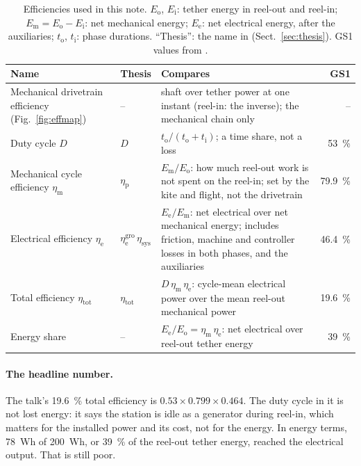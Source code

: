 \documentclass[11pt,a4paper]{article}
\begin{document}
\begin{table}[H]
\centering\small
\caption{Efficiencies used in this note. $E_\mathrm{o}$, $E_\mathrm{i}$: tether
energy in reel-out and reel-in; $E_\mathrm{m} = E_\mathrm{o} - E_\mathrm{i}$:
net mechanical energy; $E_\mathrm{e}$: net electrical energy, after the
auxiliaries; $t_\mathrm{o}$, $t_\mathrm{i}$: phase durations. ``Thesis'': the name in
\cite{fechner2016} (Sect.~\ref{sec:thesis}). GS1 values from \cite{fechner2011}.}
\label{tab:eff}
\begin{tabularx}{\textwidth}{llXr}
\toprule
Name & Thesis & Compares & GS1 \\
\midrule
Mechanical drivetrain efficiency (Fig.~\ref{fig:effmap}) & -- & shaft over tether power at one instant (reel-in: the inverse); the mechanical chain only & -- \\
Duty cycle $D$ & $D$ & $t_\mathrm{o}/(t_\mathrm{o}+t_\mathrm{i})$; a time share, not a loss & \SI{53}{\percent} \\
Mechanical cycle efficiency $\eta_\mathrm{m}$ & $\eta_\mathrm{p}$ & $E_\mathrm{m}/E_\mathrm{o}$: how much reel-out work is not spent on the reel-in; set by the kite and flight, not the drivetrain & \SI{79.9}{\percent} \\
Electrical efficiency $\eta_\mathrm{e}$ & $\eta_\mathrm{e}^\mathrm{gro}\,\eta_\mathrm{sys}$ & $E_\mathrm{e}/E_\mathrm{m}$: net electrical over net mechanical energy; includes friction, machine and controller losses in both phases, and the auxiliaries & \SI{46.4}{\percent} \\
Total efficiency $\eta_\mathrm{tot}$ & $\eta_\mathrm{tot}$ & $D\,\eta_\mathrm{m}\,\eta_\mathrm{e}$: cycle-mean electrical power over the mean reel-out mechanical power & \SI{19.6}{\percent} \\
Energy share & -- & $E_\mathrm{e}/E_\mathrm{o} = \eta_\mathrm{m}\,\eta_\mathrm{e}$: net electrical over reel-out tether energy & \SI{39}{\percent} \\
\bottomrule
\end{tabularx}
\end{table}

\paragraph{The headline number.} The talk's \SI{19.6}{\percent} total
efficiency is $0.53 \times 0.799 \times 0.464$. The duty cycle in it is not lost
energy: it says the station is idle as a generator during reel-in, which
matters for the installed power and its cost, not for the energy. In energy
terms, \SI{78}{Wh} of \SI{200}{Wh}, or \SI{39}{\percent} of the reel-out tether
energy, reached the electrical output. That is still poor.
\end{document}
